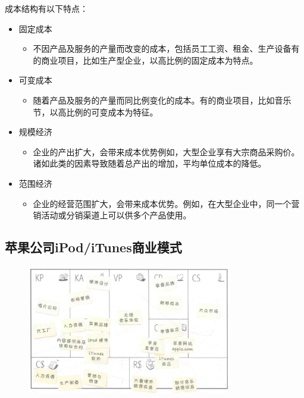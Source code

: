 	成本结构有以下特点：
	\begin{itemize}
		\item 固定成本
		\begin{itemize}
			\item 不因产品及服务的产量而改变的成本，包括员工工资、租金、生产设备有的商业项目，比如生产型企业，以高比例的固定成本为特点。
		\end{itemize}
		\item 可变成本
		\begin{itemize}
			\item 随着产品及服务的产量而同比例变化的成本。有的商业项目，比如音乐节，以高比例的可变成本为特征。
		\end{itemize}
		\item 规模经济
		\begin{itemize}
			\item 企业的产出扩大，会带来成本优势例如，大型企业享有大宗商品采购价。诸如此类的因素导致随着总产出的增加，平均单位成本的降低。
		\end{itemize}
		\item 范围经济
		\begin{itemize}
			\item 企业的经营范围扩大，会带来成本优势。例如，在大型企业中，同一个营销活动或分销渠道上可以供多个产品使用。
		\end{itemize}
	\end{itemize}

	\subsection{苹果公司iPod/iTunes商业模式}
	\begin{figure}[H]
		\centering
		\vspace{-0.5em}
		\includegraphics[width=0.8\textwidth]{img/iPod:iTunes商业模式.png}
		\vspace{-0.5em}
	\end{figure}

